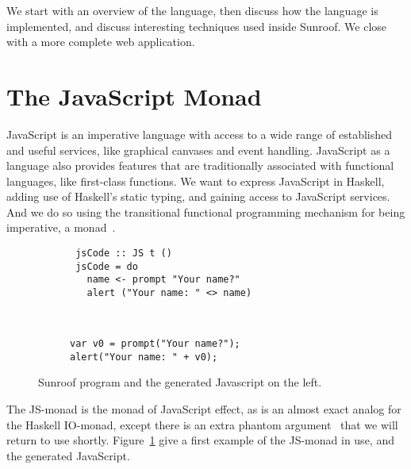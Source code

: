 \documentclass{llncs}
\begin{document}
We start with an overview of the language, then discuss
how the language is implemented, and discuss interesting
techniques used inside Sunroof. We close with a more
complete web application.

\section{The JavaScript Monad}

JavaScript is an imperative language with access to a wide range
of established and useful services, like graphical canvases and event
handling. JavaScript as a language also provides features that are
traditionally associated with functional languages, like first-class 
functions. We want to express JavaScript in Haskell, adding use
of Haskell's static typing, and gaining access to JavaScript services.
And we do so using the transitional functional programming 
mechanism for being imperative, a monad~\cite{Moggi:91:ComputationMonads}.

\begin{figure}[t]
\vspace{-0.5cm}
\centering
\begin{subfigure}{0.45\textwidth}%
\begin{verbatim}
 jsCode :: JS t ()
 jsCode = do
   name <- prompt "Your name?"
   alert ("Your name: " <> name)
\end{verbatim}%
\end{subfigure}%
\hfill%
\begin{subfigure}{0.45\textwidth}
\vspace{0.25cm}%
\begin{verbatim}
  
  
var v0 = prompt("Your name?"); 
alert("Your name: " + v0);
\end{verbatim}%
\end{subfigure}%
\caption{Sunroof program and the generated Javascript on the left.}%
\label{fig:code-example}%
\end{figure}

The JS-monad is the monad of JavaScript effect, as is an almost
exact analog for the Haskell IO-monad, except there
is an extra phantom argument~\cite{Leijen:99:Phantom} that we will return
to use shortly.  Figure~\ref{fig:code-example} give a first example
of the JS-monad in use, and the generated JavaScript.
\end{document}
